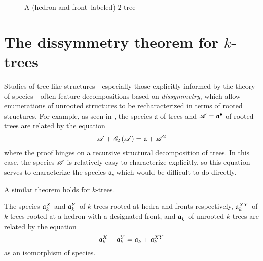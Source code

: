 \documentclass[distribution,draft]{brandiss} %
\numberwithin{section}{chapter}
\numberwithin{figure}{chapter}
\begin{document}
\begin{figure}[htb]
  \centering
  \caption{A (hedron-and-front--labeled) $2$-tree}
  \label{fig:exlab2tree}
\end{figure}

\section{The dissymmetry theorem for $k$-trees}\label{s:dissymk}
Studies of tree-like structures---especially those explicitly informed by the theory of species---often feature decompositions based on \emph{dissymmetry}, which allow enumerations of unrooted structures to be recharacterized in terms of rooted structures.
For example, as seen in \cite[\S 4.1]{bll:species}, the species $\mathfrak{a}$ of trees and $\mathscr{A} =  {\mathfrak{a}}^{\bullet } $ of rooted trees are related by the equation
\begin{equation*}
  \mathscr{A} + \mathscr{E}_{2} \left( {\mathscr{A}} \right) = \mathfrak{a} + \mathscr{A}^{2}
\end{equation*}
where the proof hinges on a recursive structural decomposition of trees.
In this case, the species $\mathscr{A}$ is relatively easy to characterize explicitly, so this equation serves to characterize the species $\mathfrak{a}$, which would be difficult to do directly.

A similar theorem holds for $k$-trees.
\begin{theorem}
  \label{thm:dissymk}
  The species $\mathfrak{a}_{k}^{X}$ and $\mathfrak{a}_{k}^{Y}$ of $k$-trees rooted at hedra and fronts respectively, $\mathfrak{a}_{k}^{XY}$ of $k$-trees rooted at a hedron with a designated front, and $\mathfrak{a}_{k}^{}$ of unrooted $k$-trees are related by the equation
  \begin{equation}
    \label{eq:dissymk}
    \mathfrak{a}_{k}^{X} + \mathfrak{a}_{k}^{Y} = \mathfrak{a}_{k}^{} + \mathfrak{a}_{k}^{XY}
  \end{equation}
  as an isomorphism of species.
\end{theorem}
\end{document}

